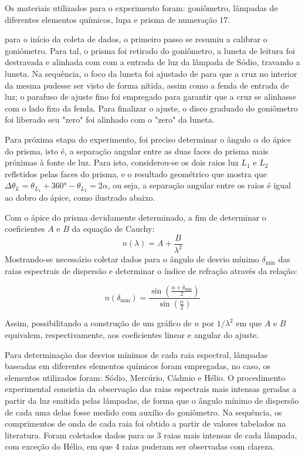 Os materiais utilizados para o experimento foram: goniômetro, lâmpadas de diferentes elementos químicos, lupa e prisma de numeração 17.

para  o início da coleta de dados, o primeiro passo se resumiu a calibrar o goniômetro. Para tal, o prisma foi retirado do goniômetro, a luneta de leitura foi destravada e alinhada com com a entrada de luz da lâmpada de Sódio, travando a luneta. Na sequência, o foco da luneta foi ajustado de para que a cruz no interior da mesma pudesse ser visto de forma nítida, assim como a fenda de entrada de luz; o parafuso de ajuste fino foi empregado para garantir que a cruz se alinhasse com o lado fixo da fenda. Para finalizar o ajuste, o disco graduado do goniômetro foi liberado seu "zero" foi alinhado com o "zero" da luneta.

Para próxima etapa do experimento, foi preciso determinar o ângulo $\alpha$ do ápice do prisma, isto é, a separação angular entre as duas faces do prisma mais próximas à fonte de luz. Para isto, considerou-se os dois raios luz $L_1$ e $L_2$ refletidos pelas faces do prisma, e o resultado geométrico que mostra que $\Delta \theta_L = \theta_{L_1} + \ang{360} - \theta_{L_2} = 2\alpha$, ou seja, a separação angular entre os raios é igual ao dobro do ápice, como ilustrado abaixo.



Com o ápice do prisma devidamente determinado, a fim de determinar o coeficientes $A$ e $B$ da equação de Cauchy:
\begin{equation}
    n(\lambda) = A + \frac{B}{\lambda^2}
    \label{eq:cauchy}
\end{equation}
Mostrando-se necessário coletar dados para o ângulo de desvio mínimo $\delta_\text{min}$ das raias espectrais de dispersão e determinar o índice de refração através da relação:

\begin{equation}
    n\left(\delta_\text{min}\right) = \frac{
        \sin\left(\frac{\alpha + \delta_\text{min}}{2}\right)
    }{
        \sin\left(\frac{\alpha}{2}\right)
    }
    \label{eq:n}
\end{equation}

 Assim, possibilitando a construção de um gráfico de $n$ por $1/\lambda^2$ em que $A$ e $B$ equivalem, respectivamente, aos coeficientes linear e angular do ajuste.

Para determinação dos desvios mínimos de cada raia espectral, lâmpadas baseadas em diferentes elementos químicos foram empregadas, no caso, os elementos utilizados foram: Sódio, Mercúrio, Cádmio e Hélio. O procedimento experimental consistia da observação das raias espectrais mais intensas geradas a partir da luz emitida pelas lâmpadas, de forma que o ângulo mínimo de dispersão de cada uma delas fosse medido com auxilio do goniômetro. Na sequência, os comprimentos de onda de cada raia foi obtido a partir de valores tabelados na literatura. Foram coletados dados para as 3 raias mais intensas de cada lâmpada, com exceção do Hélio, em que 4 raias puderam ser observadas com clareza.

